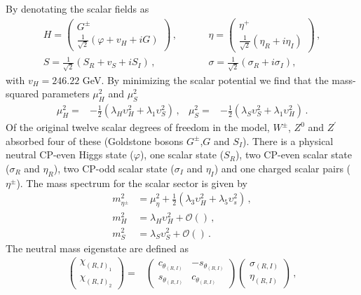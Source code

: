 \documentclass[12pt]{article}
\begin{document}
By denotating the scalar fields as
%
\begin{align*}
  H = \begin{pmatrix}G^{\pm} \\ \frac{1}{\sqrt{2}} (\varphi+v_{H}+iG) \end{pmatrix} \,,&\hspace{1cm}
  \eta = \begin{pmatrix}\eta^{+} \\ \frac{1}{\sqrt{2}}(\eta_R+i\eta_I) \end{pmatrix} \,,\\
  S = \frac{1}{\sqrt{2}} (S_R+v_{S}+iS_I)\,,&\hspace{1cm}\sigma = \frac{1}{\sqrt{2}} (\sigma_R+i\sigma_I),
\end{align*}
%
with $v_H= 246.22$ GeV.  
By minimizing the scalar potential we find that the mass-squared parameters $\mu_H^2$ and $\mu_S^2$
%
\begin{align*}
    \mu^{2}_{H} =& -\frac{1}{2}\left( \lambda_{H}  \upsilon^{2}_{H} + \lambda_{1}  \upsilon^{2}_{S}\right)\,,  &
    \mu^{2}_{S} =& -\frac{1}{2}\left( \lambda_{S}  \upsilon^{2}_{S} + \lambda_{1}  \upsilon^{2}_{H}\right)\,.
\end{align*}
%
Of the original twelve scalar degrees of freedom in the model, $W^{\pm}$, $Z^{0}$ and $Z^{\prime}$ absorbed four of these (Goldstone bosons $G^{\pm}$,$G$ and $S_{I}$). There is a physical neutral CP-even Higgs state ($\varphi$), one scalar state ($S_{R}$), two CP-even scalar state ($\sigma_{R}$ and $\eta_{R}$), two CP-odd scalar state ($\sigma_{I}$ and $\eta_{I}$) and one charged scalar pairs ($\eta^{\pm}$). The mass spectrum for the scalar sector is given by
\begin{align*}
    m_{\eta^{\pm}}^{2} &= \mu_{\eta}^{2} + \frac{1}{2} (\lambda_{3} \upsilon^{2}_{H} + \lambda_{5} \upsilon^{2}_{s} )\,, \\
    m_{H}^{2} &= \lambda_{H} \upsilon_{H}^{2} + \mathcal{O}()\,, \\
    m_{S}^{2} &= \lambda_{S} \upsilon_{S}^{2} + \mathcal{O}()\,.
\end{align*}
%
The neutral mass eigenstate are defined as
%
\begin{align*}
    \begin{pmatrix}\chi_{(R,I)_{1}} \\ \chi_{(R,I)_{2}} \end{pmatrix} =& \begin{pmatrix} c_{\theta_{(R,I)}} & -s_{\theta_{(R,I)}} \\ s_{\theta_{(R,I)}} & c_{\theta_{(R,I)}} \end{pmatrix} \begin{pmatrix}\sigma_{(R,I)} \\ \eta_{(R,I)} \end{pmatrix} \,,
\end{align*}
\end{document}
